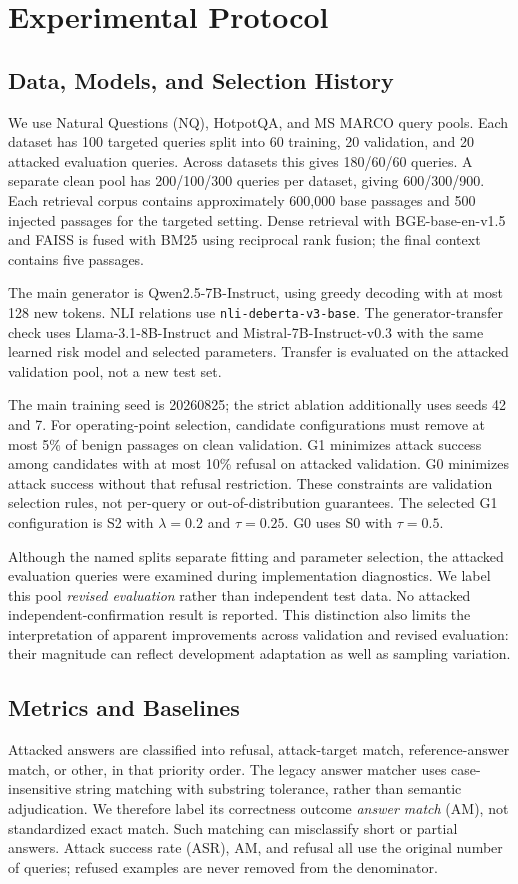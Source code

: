 \documentclass[sigconf]{aamas}
\begin{document}
\section{Experimental Protocol}
\label{sec:protocol}
\subsection{Data, Models, and Selection History}
We use Natural Questions (NQ), HotpotQA, and MS MARCO query pools. Each dataset has 100 targeted queries split into 60 training, 20 validation, and 20 attacked evaluation queries. Across datasets this gives 180/60/60 queries. A separate clean pool has 200/100/300 queries per dataset, giving 600/300/900. Each retrieval corpus contains approximately 600,000 base passages and 500 injected passages for the targeted setting. Dense retrieval with BGE-base-en-v1.5 and FAISS is fused with BM25 using reciprocal rank fusion; the final context contains five passages.

The main generator is Qwen2.5-7B-Instruct, using greedy decoding with at most 128 new tokens. NLI relations use \texttt{nli-deberta-v3-base}. The generator-transfer check uses Llama-3.1-8B-Instruct and Mistral-7B-Instruct-v0.3 with the same learned risk model and selected parameters. Transfer is evaluated on the attacked validation pool, not a new test set.

The main training seed is 20260825; the strict ablation additionally uses seeds 42 and 7. For operating-point selection, candidate configurations must remove at most 5\% of benign passages on clean validation. G1 minimizes attack success among candidates with at most 10\% refusal on attacked validation. G0 minimizes attack success without that refusal restriction. These constraints are validation selection rules, not per-query or out-of-distribution guarantees. The selected G1 configuration is S2 with $\lambda=0.2$ and $\tau=0.25$. G0 uses S0 with $\tau=0.5$.

Although the named splits separate fitting and parameter selection, the attacked evaluation queries were examined during implementation diagnostics. We label this pool \emph{revised evaluation} rather than independent test data. No attacked independent-confirmation result is reported. This distinction also limits the interpretation of apparent improvements across validation and revised evaluation: their magnitude can reflect development adaptation as well as sampling variation.

\subsection{Metrics and Baselines}
Attacked answers are classified into refusal, attack-target match, reference-answer match, or other, in that priority order. The legacy answer matcher uses case-insensitive string matching with substring tolerance, rather than semantic adjudication. We therefore label its correctness outcome \emph{answer match} (AM), not standardized exact match. Such matching can misclassify short or partial answers. Attack success rate (ASR), AM, and refusal all use the original number of queries; refused examples are never removed from the denominator.
\end{document}
